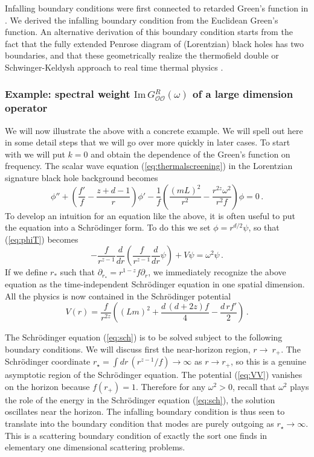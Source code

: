 \documentclass[10pt, oneside]{book}
\def\be{\begin{equation}}
\def\ee{\end{equation}}
\def\ocal{{\mathcal{O}}}
\begin{document}
\begin{doublespace}
Infalling boundary conditions were first connected to retarded Green's function in \cite{Son:2002sd}. We derived the infalling boundary condition from the Euclidean Green's function. An alternative derivation of this boundary condition starts from the fact that the fully extended Penrose diagram of (Lorentzian) black holes has two boundaries, and that these geometrically realize the thermofield double or Schwinger-Keldysh approach to real time thermal physics \cite{Herzog:2002pc,Skenderis:2008dh}.

\subsubsection{Example: spectral weight $\text{Im}\, G^R_{\ocal \ocal}(\omega)$ of a large dimension operator}
\label{sec:largeDelta}

We will now illustrate the above with a concrete example. We will spell out here in some detail steps that we will go over more quickly in later cases. To start with we will put $k=0$ and obtain the dependence of the Green's function on frequency. The scalar wave equation (\ref{eq:thermalscreening}) in the Lorentzian signature black hole background becomes
\be\label{eq:phiT}
\phi'' + \left(\frac{f'}{f} - \frac{z+d-1}{r} \right) \phi' - \frac{1}{f}\left( \frac{(mL)^2}{r^2} - \frac{r^{2z} \omega^2}{r^2 f}\right)\phi = 0 \,.
\ee
To develop an intuition for an equation like the above, it is often useful to put the equation into a Schr\"odinger form. To do this we set $\phi = r^{d/2} \psi$, so that (\ref{eq:phiT}) becomes
\be\label{eq:sch}
- \frac{f}{r^{z-1}} \frac{d}{dr} \left(\frac{f}{r^{z-1}} \frac{d}{dr} \psi \right) + V \psi = \omega^2 \psi \,.
\ee
If we define $r_*$ such that $\partial_{r_*} = r^{1-z}f \partial_r$, we immediately recognize the above equation as the time-independent Schr\"odinger equation in one spatial dimension.  All the physics is now contained in the Schr\"odinger potential
\be\label{eq:VV}
V(r) = \frac{f}{r^{2z}} \left((Lm)^2  + \frac{d \, (d+2z) f}{4} - \frac{d \, r f'}{2} \right) \,.
\ee

The Schr\"odinger equation (\ref{eq:sch}) is to be solved subject to the following boundary conditions. We will discuss first the near-horizon region, $r \to\ r_+$. The Schr\"odinger coordinate $r_\star = \int dr \, \left( r^{z-1}/f \right) \to \infty$ as $r \to r_+$, so this is a genuine asymptotic region of the Schr\"odinger equation. The potential (\ref{eq:VV}) vanishes on the horizon because $f(r_+)=1$.  Therefore for any $\omega^2>0$, recall that $\omega^2$ plays the role of the energy in the Schr\"odinger equation (\ref{eq:sch}), the solution oscillates near the horizon. The infalling boundary condition is thus seen to translate into the boundary condition that modes are purely outgoing as $r_\star \to \infty$. This is a scattering boundary condition of exactly the sort one finds in elementary one dimensional scattering problems.


\end{doublespace}
\end{document}
